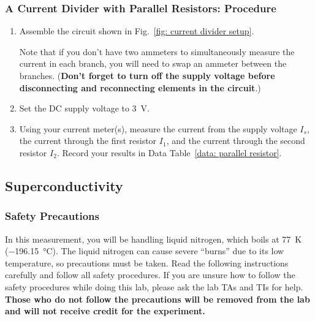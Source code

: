 \documentclass[addpoints]{physlabs}
\begin{document}
\begin{labsection}
\begin{experiment}
\subsubsection*{A Current Divider with Parallel Resistors: Procedure}

\begin{enumerate}
    \item Assemble the circuit shown in Fig.~\ref{fig: current divider setup}.
    
    Note that if you don't have two ammeters to simultaneously measure the current in each branch, you will need to swap an ammeter between the branches. (\textbf{Don't forget to turn off the supply voltage before disconnecting and reconnecting elements in the circuit}.)

    \item Set the DC supply voltage to \qty{3}{\volt}.
    
    \item Using your current meter(s), measure the current from the supply voltage $I_s$, the current through the first resistor $I_1$, and the current through the second resistor $I_2$. Record your results in Data Table~\ref{data: parallel resistor}.
\end{enumerate}

\subsection*{Superconductivity}

\begin{center}
\setlength{\fboxsep}{6pt}%
\setlength{\fboxrule}{2pt}%
\end{center}

\subsubsection*{Safety Precautions}

In this measurement, you will be handling liquid nitrogen, which boils at \qty{77}{\kelvin} (\qty{-196.15}{\celsius}). 
The liquid nitrogen can cause severe ``burns'' due to its low temperature, so precautions must be taken. 
Read the following instructions carefully and follow all safety procedures. If you are unsure how to follow the safety procedures while doing this lab, please ask the lab TAs and TIs for help. \textbf{Those who do not follow the precautions will be removed from the lab and will not receive credit for the experiment.}


\end{experiment}
\end{labsection}
\end{document}
